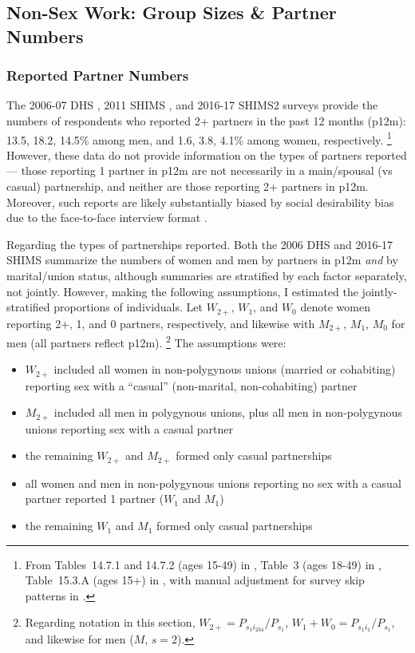 \subsection{Non-Sex Work: Group Sizes \& Partner Numbers}\label{model.par.nsw}
\subsubsection{Reported Partner Numbers}\label{model.par.nsw.report}
The 2006-07 DHS \cite{SDHS2006}, 2011 SHIMS \cite{SHIMS1}, and 2016-17 SHIMS2 \cite{SHIMS2} surveys
provide the numbers of respondents who reported 2+ partners in the past 12 months (p12m):
13.5, 18.2, 14.5\% among men, and 1.6, 3.8, 4.1\% among women, respectively.%
\footnote{From
  Tables~14.7.1 and 14.7.2 (ages 15-49) in \cite{SDHS2006},
  Table~3 (ages 18-49) in \cite{SHIMS1},
  Table~15.3.A (ages 15+) in \cite{SHIMS2},
  with manual adjustment for survey skip patterns in \cite{SDHS2006,SHIMS2}.}
However, these data do not provide information on the types of partners reported
--- \ie those reporting 1 partner in p12m
are not necessarily in a main/spousal (vs casual) partnership,
and neither are those reporting 2+ partners in p12m.
Moreover, such reports are likely substantially biased by
social desirability bias due to the face-to-face interview format
\cite{Konings1995,Plummer2004,Gregson2004,Behanzin2013}.
\par
Regarding the types of partnerships reported.
Both the 2006 DHS \cite[Tables 14.6.1 and 14.6.2]{SDHS2006}
and 2016-17 SHIMS \cite[Tables 15.4.A and 15.4.B]{SHIMS2}
summarize the numbers of women and men by partners in p12m \emph{and} by marital/union status,
although summaries are stratified by each factor separately, not jointly.
However, making the following assumptions,
I estimated the jointly-stratified proportions of individuals.
Let $W_{2+}$, $W_{1}$, and $W_{0}$ denote women reporting 2+, 1, and 0 partners, respectively,
and likewise with $M_{2+}$, $M_{1}$, $M_{0}$ for men (all partners reflect p12m).%
\footnote{Regarding notation in this section,
  $W_{2+} = P_{s_{1}i_{234}} / P_{s_{1}}$,
  $W_{1} + W_{0} = P_{s_{1}i_{1}} / P_{s_{1}}$, and likewise for men ($M$, $s = 2$).}
The assumptions were:
\begin{itemize}
  \item $W_{2+}$ included all women in non-polygynous unions (married or cohabiting)
  reporting sex with a ``casual'' (non-marital, non-cohabiting) partner
  \item $M_{2+}$ included all men in polygynous unions,
  plus all men in non-polygynous unions reporting sex with a casual partner
  \item the remaining $W_{2+}$ and $M_{2+}$ formed only casual partnerships
  \item all women and men in non-polygynous unions
  reporting no sex with a casual partner reported 1 partner ($W_{1}$ and $M_{1}$)
  \item the remaining $W_{1}$ and $M_{1}$ formed only casual partnerships
\end{itemize}

